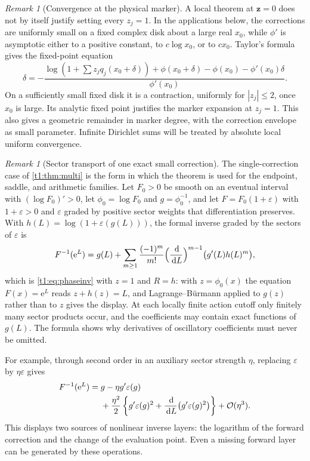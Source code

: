 \documentclass[11pt,openany]{book}
\numberwithin{equation}{chapter}
\theoremstyle{plain}
\theoremstyle{definition}
\theoremstyle{remark}
\newtheorem{remark}[theorem]{Remark}
\newcommand{\ee}{\mathrm e}
\newcommand{\dd}{\,\mathrm d}                 %
\begin{document}
\begin{remark}[Convergence at the physical marker]
A local theorem at $\bm z=0$ does not by itself justify setting every $z_j=1$. In the applications below, the corrections are uniformly small on a fixed complex disk about a large real $x_0$, while $\phi'$ is asymptotic either to a positive constant, to $c\log x_0$, or to $cx_0$. Taylor's formula gives the fixed-point equation
\[
 \delta=-\frac{\log(1+\sum z_jq_j(x_0+\delta))
 +\phi(x_0+\delta)-\phi(x_0)-\phi'(x_0)\delta}{\phi'(x_0)}.
\]
On a sufficiently small fixed disk it is a contraction, uniformly for $|z_j|\le2$, once $x_0$ is large. Its analytic fixed point justifies the marker expansion at $z_j=1$. This also gives a geometric remainder in marker degree, with the correction envelope as small parameter. Infinite Dirichlet sums will be treated by absolute local uniform convergence.
\end{remark}

\begin{remark}[Sector transport of one exact small correction]
\label{ct:rmk:transport}
The single-correction case of \cref{t1:thm:multi} is the form in which the
theorem is used for the endpoint, saddle, and arithmetic families.  Let
$F_0>0$ be smooth on an eventual interval with $(\log F_0)'>0$, let
$\phi_0=\log F_0$ and $g=\phi_0^{-1}$, and let $F=F_0(1+\varepsilon)$ with
$1+\varepsilon>0$ and $\varepsilon$ graded by positive sector weights that
differentiation preserves.  With $h(L)=\log(1+\varepsilon(g(L)))$, the formal
inverse graded by the sectors of $\varepsilon$ is
\begin{equation}
 F^{-1}(\ee^{L})=g(L)+\sum_{m\ge1}\frac{(-1)^m}{m!}
 \Bigl(\frac{\dd}{\dd L}\Bigr)^{m-1}\bigl(g'(L)h(L)^m\bigr),
 \label{ct:eq:transport}
\end{equation}
which is \cref{t1:eq:phaseinv} with $z=1$ and $R=h$: with $z=\phi_0(x)$ the
equation $F(x)=\ee^L$ reads $z+h(z)=L$, and Lagrange--B\"urmann applied to
$g(z)$ rather than to $z$ gives the display.  At each locally finite action
cutoff only finitely many sector products occur, and the coefficients may
contain exact functions of $g(L)$.  The formula shows why derivatives of
oscillatory coefficients must never be omitted.
\end{remark}

For example, through second order in an auxiliary sector strength $\eta$, replacing $\varepsilon$ by $\eta\varepsilon$ gives
\begin{align}
 F^{-1}(\ee^L)
 ={}&g-\eta g'\varepsilon(g)\nonumber\\
 &+\frac{\eta^2}{2}\left\{g'\varepsilon(g)^2
       +\frac{\dd}{\dd L}\bigl(g'\varepsilon(g)^2\bigr)\right\}
       +\bigO(\eta^3).
 \label{t2:eq:transport-second}
\end{align}
This displays two sources of nonlinear inverse layers: the logarithm of the forward correction and the change of the evaluation point. Even a missing forward layer can be generated by these operations.
\end{document}
